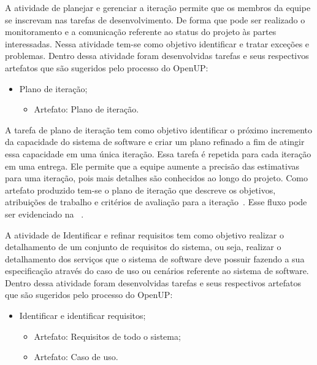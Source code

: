 A atividade de planejar e gerenciar a iteração permite que os membros da equipe se inscrevam nas tarefas de desenvolvimento. De forma que pode ser realizado o monitoramento e a comunicação referente ao status do projeto às partes interessadas. Nessa atividade tem-se como objetivo identificar e tratar exceções e problemas. Dentro dessa atividade foram desenvolvidas tarefas e seus respectivos artefatos que são sugeridos pelo processo do \acrfull{OpenUP}:

\begin{itemize}
    \item Plano de iteração;
        \begin{itemize}
            \item Artefato: Plano de iteração.
        \end{itemize}
\end{itemize}

%

A tarefa de plano de iteração tem como objetivo identificar o próximo incremento da capacidade do sistema de software e criar um plano refinado a fim de atingir essa capacidade em uma única iteração. Essa tarefa é repetida para cada iteração em uma entrega. Ele permite que a equipe aumente a precisão das estimativas para uma iteração, pois mais detalhes são conhecidos ao longo do projeto. Como artefato produzido tem-se  o plano de iteração que descreve os objetivos, atribuições de trabalho e critérios de avaliação para a iteração~\cite{openup}. Esse fluxo pode ser evidenciado na ~.


A atividade de Identificar e refinar requisitos tem como objetivo realizar o detalhamento de um conjunto de requisitos do sistema, ou seja, realizar o detalhamento dos serviços que o sistema de software deve possuir fazendo a sua especificação através do caso de uso ou cenários referente ao sistema de software. Dentro dessa atividade foram desenvolvidas tarefas e seus respectivos artefatos que são sugeridos pelo processo do \acrfull{OpenUP}:

\begin{itemize}
    \item Identificar e identificar requisitos;
        \begin{itemize}
            \item Artefato: Requisitos de todo o sistema;
            \item Artefato: Caso de uso.
        \end{itemize}
\end{itemize}


